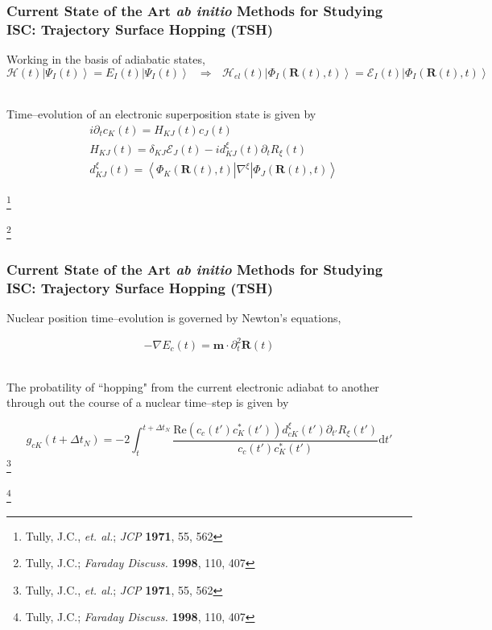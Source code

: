\documentclass[usepdftitle=false,10pt]{beamer}
\newcommand{\ket}[1]{\left\vert #1 \right\rangle}         %
\newcommand{\innerop}[3]{\left\langle #1 \left\vert #2 \right\vert #3 \right\rangle}  %
\renewcommand{\Re}{\text{Re}}                             %
\newcommand*\vc[1]{\boldsymbol{#1}}
\newcommand*\op[1]{\mathcal{#1}}
\newcommand\blfootnote[1]{%
  \begingroup
  \renewcommand\thefootnote{}\footnote{#1}%
  \addtocounter{footnote}{-1}%
  \endgroup
}
\begin{document}
\begin{frame}
  \frametitle{Current State of the Art \emph{ab initio} Methods for Studying 
  ISC: Trajectory Surface Hopping (TSH)}

  Working in the basis of adiabatic states,
  \begin{equation*}
    \op{H}(t) \ket{\Psi_I (t)} = E_I(t) \ket{\Psi_I (t)}
    \text{ }\Longrightarrow \text{ }
    \op{H}_{el}(t)\ket{\Phi_I(\vc{R}(t),t)} = 
      \mathcal{E}_I(t)\ket{\Phi_I(\vc{R}(t),t)}
  \end{equation*}
  
  ~\\
  Time--evolution of an electronic superposition state is given by
  \begin{align*}
    &i  \partial_t c_K(t) = H_{KJ}(t) c_J(t) \\
    &H_{KJ}(t) = \delta_{KJ}\mathcal{E}_J(t) - i d_{KJ}^\xi (t) \partial_t R_{\xi}(t) \\
    &d_{KJ}^\xi (t) = \innerop{\Phi_K(\vc{R}(t),t)}{\nabla^\xi}{\Phi_J(\vc{R}(t),t)}
  \end{align*}

  \blfootnote{\tiny Tully, J.C., \emph{et. al.}; \emph{JCP} \textbf{1971}, 55, 562}
  \blfootnote{\tiny Tully, J.C.; \emph{Faraday Discuss.} \textbf{1998}, 110, 407}
\end{frame}

\begin{frame}
  \frametitle{Current State of the Art \emph{ab initio} Methods for Studying 
  ISC: Trajectory Surface Hopping (TSH)}

  Nuclear position time--evolution is governed by Newton's equations,

  \begin{equation*}
    -\nabla E_c(t) = \vc{m}\cdot \partial_t^2\vc{R}(t)
  \end{equation*}

  ~\\
  The probatility of ``hopping" from the current electronic adiabat to another
  through out the course of a nuclear time--step is given by

  \begin{equation*}
    g_{cK}(t + \Delta t_N) = -2 \int_t^{t + \Delta t_N} 
      \frac{\Re(c_c(t') c^*_K(t'))d_{cK}^\xi (t') \partial_{t'}
      R_{\xi}(t')}{c_c(t') c^*_K(t')}\mathrm{d}t'
  \end{equation*}
  \blfootnote{\tiny Tully, J.C., \emph{et. al.}; \emph{JCP} \textbf{1971}, 55, 562}
  \blfootnote{\tiny Tully, J.C.; \emph{Faraday Discuss.} \textbf{1998}, 110, 407}
\end{frame}
\end{document}
